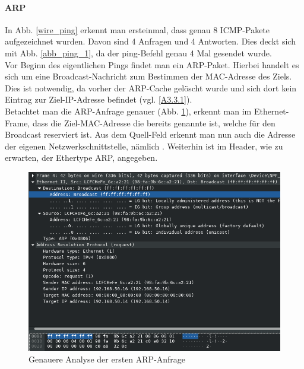 \paragraph{ARP}\label{A2.3.2.arp}
In Abb. \ref{wire_ping} erkennt man ersteinmal, dass genau 8 ICMP-Pakete aufgezeichnet wurden. Davon sind 4 Anfragen und 4 Antworten. Dies deckt sich mit Abb. \ref{abb_ping_1}, da der ping-Befehl genau 4 Mal gesendet wurde.\\

Vor Beginn des eigentlichen Pings findet man ein ARP-Paket. Hierbei handelt es sich um eine Broadcast-Nachricht zum Bestimmen der MAC-Adresse des Ziels. Dies ist notwendig, da vorher der ARP-Cache gelöscht wurde und sich dort kein Eintrag zur Ziel-IP-Adresse befindet (vgl. \ref{A3.3.1}).\\

Betachtet man die ARP-Anfrage genauer (Abb. \ref{arp_broadcast}), erkennt man im Ethernet-Frame, dass die Ziel-MAC-Adresse die bereits genannte  ist, welche für den Broadcast reserviert ist. Aus dem Quell-Feld erkennt man nun auch die Adresse der eigenen Netzwerkschnittstelle, nämlich . Weiterhin ist im Header, wie zu erwarten, der Ethertype ARP, angegeben.

\begin{figure}[H]
  \begin{center}
    \includegraphics[width=\textwidth]{graphics/versuch/3_3/wireshark/arp_broadcast}
    \caption{Genauere Analyse der ersten ARP-Anfrage}\label{arp_broadcast}
  \end{center}
\end{figure}

